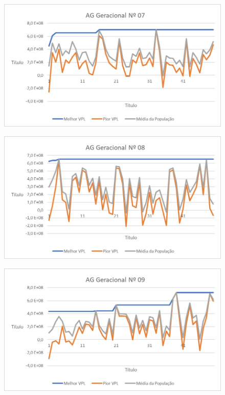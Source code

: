 \documentclass[12pt,a4paper]{report}
\begin{document}
\begin{figure}[H]
\centering

\includegraphics[scale=1]{AGG/7}

\end{figure}

\begin{figure}[H]
\centering

\includegraphics[scale=1]{AGG/8}

\end{figure}

\begin{figure}[H]
\centering

\includegraphics[scale=1]{AGG/9}

\end{figure}
\end{document}

